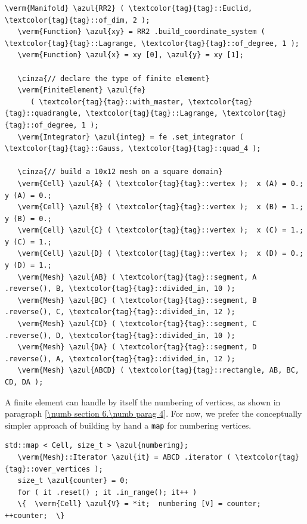 \begin{Verbatim}[commandchars=\\\{\},formatcom=\small\tt,frame=single,
   label=parag-\ref{\numb section 6.\numb parag 2}.cpp,rulecolor=\color{coment},
   baselinestretch=0.94,framesep=2mm                                            ]
   \verm{Manifold} \azul{RR2} ( \textcolor{tag}{tag}::Euclid, \textcolor{tag}{tag}::of_dim, 2 );
   \verm{Function} \azul{xy} = RR2 .build_coordinate_system ( \textcolor{tag}{tag}::Lagrange, \textcolor{tag}{tag}::of_degree, 1 );
   \verm{Function} \azul{x} = xy [0], \azul{y} = xy [1];

   \cinza{// declare the type of finite element}
   \verm{FiniteElement} \azul{fe}
      ( \textcolor{tag}{tag}::with_master, \textcolor{tag}{tag}::quadrangle, \textcolor{tag}{tag}::Lagrange, \textcolor{tag}{tag}::of_degree, 1 );
   \verm{Integrator} \azul{integ} = fe .set_integrator ( \textcolor{tag}{tag}::Gauss, \textcolor{tag}{tag}::quad_4 );

   \cinza{// build a 10x12 mesh on a square domain}
   \verm{Cell} \azul{A} ( \textcolor{tag}{tag}::vertex );  x (A) = 0.;   y (A) = 0.;
   \verm{Cell} \azul{B} ( \textcolor{tag}{tag}::vertex );  x (B) = 1.;   y (B) = 0.;
   \verm{Cell} \azul{C} ( \textcolor{tag}{tag}::vertex );  x (C) = 1.;   y (C) = 1.;
   \verm{Cell} \azul{D} ( \textcolor{tag}{tag}::vertex );  x (D) = 0.;   y (D) = 1.;
   \verm{Mesh} \azul{AB} ( \textcolor{tag}{tag}::segment, A .reverse(), B, \textcolor{tag}{tag}::divided_in, 10 );
   \verm{Mesh} \azul{BC} ( \textcolor{tag}{tag}::segment, B .reverse(), C, \textcolor{tag}{tag}::divided_in, 12 );
   \verm{Mesh} \azul{CD} ( \textcolor{tag}{tag}::segment, C .reverse(), D, \textcolor{tag}{tag}::divided_in, 10 );
   \verm{Mesh} \azul{DA} ( \textcolor{tag}{tag}::segment, D .reverse(), A, \textcolor{tag}{tag}::divided_in, 12 );
   \verm{Mesh} \azul{ABCD} ( \textcolor{tag}{tag}::rectangle, AB, BC, CD, DA );
\end{Verbatim}

A finite element can handle by itself the numbering of vertices, as shown in paragraph
\ref{\numb section 6.\numb parag 4}.
For now, we prefer the conceptually simpler approach of building by hand a {\small\tt map}
for numbering vertices.

\begin{Verbatim}[commandchars=\\\{\},formatcom=\small\tt,frame=single,
   label=parag-\ref{\numb section 6.\numb parag 2}.cpp,rulecolor=\color{coment},
   baselinestretch=0.94,framesep=2mm                                            ]
   std::map < Cell, size_t > \azul{numbering};
   \verm{Mesh}::Iterator \azul{it} = ABCD .iterator ( \textcolor{tag}{tag}::over_vertices );
   size_t \azul{counter} = 0;
   for ( it .reset() ; it .in_range(); it++ )
   \{  \verm{Cell} \azul{V} = *it;  numbering [V] = counter;  ++counter;  \}
\end{Verbatim}


